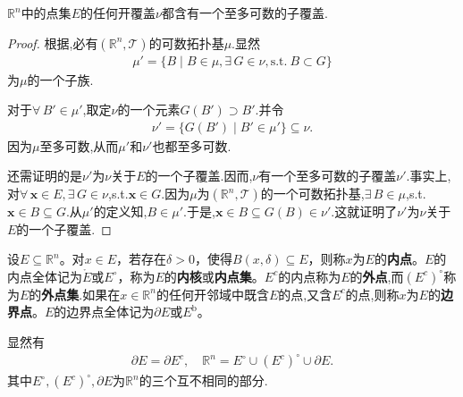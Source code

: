 \documentclass[../../main.tex]{subfiles}%
\begin{document}
\begin{theorem}[Lindelöf定理]\label{theorem:Lindelöf定理}
$\mathbb{R}^n$中的点集$E$的任何开覆盖$\nu$都含有一个至多可数的子覆盖.
\end{theorem}
\begin{proof}

根据,必有$(\mathbb{R}^n,\mathcal{T})$的可数拓扑基$\mu$.显然
\begin{align*}
\mu'=\{B\mid B\in\mu,\exists\,G\in\nu,\text{s.t.}\ B\subset G\}
\end{align*}
为$\mu$的一个子族.

对于$\forall\,B'\in\mu'$,取定$\nu$的一个元素$G(B')\supset B'$.并令
\begin{align*}
\nu'=\{G(B')\mid B'\in\mu'\}\subseteq\nu.
\end{align*}
因为$\mu$至多可数,从而$\mu'$和$\nu'$也都至多可数.

还需证明的是$\nu'$为$\nu$关于$E$的一个子覆盖.因而,$\nu$有一个至多可数的子覆盖$\nu'$.事实上,对$\forall\,\boldsymbol{x}\in E,\exists\,G\in\nu$,s.t.$\boldsymbol{x}\in G$.因为$\mu$为$(\mathbb{R}^n,\mathcal{T})$的一个可数拓扑基,$\exists\,B\in\mu$,s.t.$\boldsymbol{x}\in B\subseteq G$.从$\mu'$的定义知,$B\in\mu'$.于是,$\boldsymbol{x}\in B\subseteq G(B)\in\nu'$.这就证明了$\nu'$为$\nu$关于$E$的一个子覆盖.

\end{proof}

\begin{definition}[内点与边界点]\label{definition:内点与边界点}
设\(E\subseteq\mathbb{R}^n\)。对\(x\in E\)，若存在\(\delta>0\)，使得\(B(x,\delta)\subseteq E\)，则称\(x\)为\(E\)的\textbf{内点}。\(E\)的内点全体记为\(\mathring{E}\)或$E^{\circ}$，称为\(E\)的\textbf{内核}或\textbf{内点集}。$E^c$的内点称为$E$的\textbf{外点},而$(E^c)^{\circ}$称为$E$的\textbf{外点集}.如果在$x\in \mathbb{R}^n$的任何开邻域中既含$E$的点,又含$E^c$的点,则称\(x\)为\(E\)的\textbf{边界点}。$E$的边界点全体记为\(\partial E\)或$E^{\mathrm{b}}$。
\end{definition}
\begin{note}
显然有
\begin{align*}
\partial E=\partial E^c,\quad \mathbb{R} ^n=E^{\circ}\cup \left( E^c \right) ^{\circ}\cup \partial E.
\end{align*}
其中$E^{\circ},\left( E^c \right) ^{\circ},\partial E$为$\mathbb{R}^n$的三个互不相同的部分.
\end{note}
\end{document}
